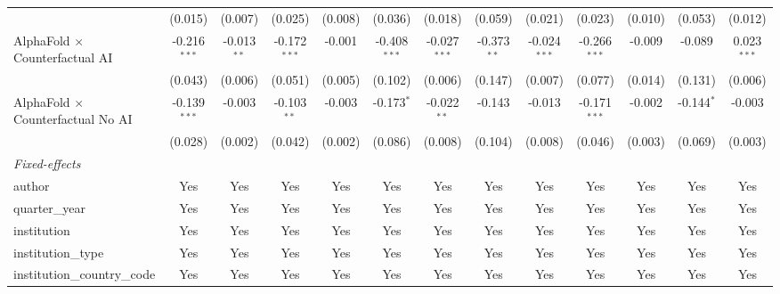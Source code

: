 \begin{tabular}{lcccccccccccc}
                                            & (0.015)        & (0.007)       & (0.025)        & (0.008) & (0.036)        & (0.018)        & (0.059)       & (0.021)        & (0.023)        & (0.010)      & (0.053)       & (0.012)\\   
   AlphaFold $\times$ Counterfactual AI     & -0.216$^{***}$ & -0.013$^{**}$ & -0.172$^{***}$ & -0.001  & -0.408$^{***}$ & -0.027$^{***}$ & -0.373$^{**}$ & -0.024$^{***}$ & -0.266$^{***}$ & -0.009       & -0.089        & 0.023$^{***}$\\   
                                            & (0.043)        & (0.006)       & (0.051)        & (0.005) & (0.102)        & (0.006)        & (0.147)       & (0.007)        & (0.077)        & (0.014)      & (0.131)       & (0.006)\\   
   AlphaFold $\times$ Counterfactual No AI  & -0.139$^{***}$ & -0.003        & -0.103$^{**}$  & -0.003  & -0.173$^{*}$   & -0.022$^{**}$  & -0.143        & -0.013         & -0.171$^{***}$ & -0.002       & -0.144$^{*}$  & -0.003\\   
                                            & (0.028)        & (0.002)       & (0.042)        & (0.002) & (0.086)        & (0.008)        & (0.104)       & (0.008)        & (0.046)        & (0.003)      & (0.069)       & (0.003)\\   
   \midrule
   \emph{Fixed-effects}\\
   author                                   & Yes            & Yes           & Yes            & Yes     & Yes            & Yes            & Yes           & Yes            & Yes            & Yes          & Yes           & Yes\\  
   quarter\_year                            & Yes            & Yes           & Yes            & Yes     & Yes            & Yes            & Yes           & Yes            & Yes            & Yes          & Yes           & Yes\\  
   institution                              & Yes            & Yes           & Yes            & Yes     & Yes            & Yes            & Yes           & Yes            & Yes            & Yes          & Yes           & Yes\\  
   institution\_type                        & Yes            & Yes           & Yes            & Yes     & Yes            & Yes            & Yes           & Yes            & Yes            & Yes          & Yes           & Yes\\  
   institution\_country\_code               & Yes            & Yes           & Yes            & Yes     & Yes            & Yes            & Yes           & Yes            & Yes            & Yes          & Yes           & Yes\\  

\end{tabular}
